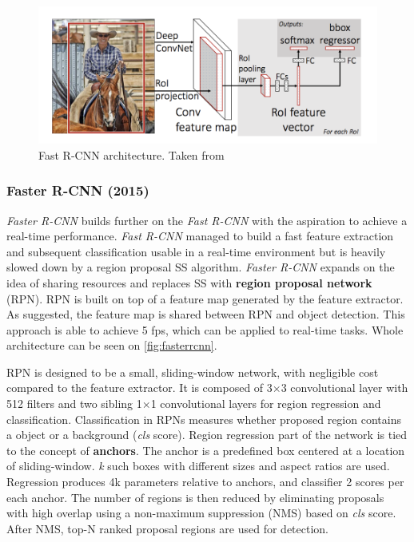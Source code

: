 \begin{figure}
    \centering
    \includegraphics[width=\textwidth]{img/fastrcnn}
    \caption{Fast R-CNN architecture. Taken from \cite[fig. 1]{bib:fastrcnn}}
    \label{fig:fastrcnn}
\end{figure}

\subsubsection{Faster R-CNN (2015)}
 
 \textit{Faster R-CNN} \cite{bib:fasterrcnn} builds further on the \textit{Fast R-CNN} with the aspiration to achieve a real-time performance. \textit{Fast R-CNN} managed to build a fast feature extraction and subsequent classification usable in a real-time environment but is heavily slowed down by a region proposal SS algorithm. \textit{Faster R-CNN} expands on the idea of sharing resources and replaces SS with \textbf{region proposal network} (RPN). RPN is built on top of a feature map generated by the feature extractor. As suggested, the feature map is shared between RPN and object detection. This approach is able to achieve 5 fps, which can be applied to real-time tasks.  Whole architecture can be seen on \cref{fig:fasterrcnn}. 
 
 RPN is designed to be a small, sliding-window network, with negligible cost compared to the feature extractor. It is composed of 3$\times$3 convolutional layer with 512 filters and two sibling 1$\times$1 convolutional layers for region regression and classification. Classification in RPNs measures whether proposed region contains a object or a background (\textit{cls} score). Region regression part of the network is tied to the concept of \textbf{anchors}. The anchor is a predefined box centered at a location of sliding-window. \textit{k} such boxes with different sizes and aspect ratios are used. Regression produces 4k parameters relative to anchors, and classifier 2 scores per each anchor. The number of regions is then reduced by eliminating proposals with high overlap using a non-maximum suppression (NMS) based on \textit{cls} score. After NMS, top-N ranked proposal regions are used for detection.
 
